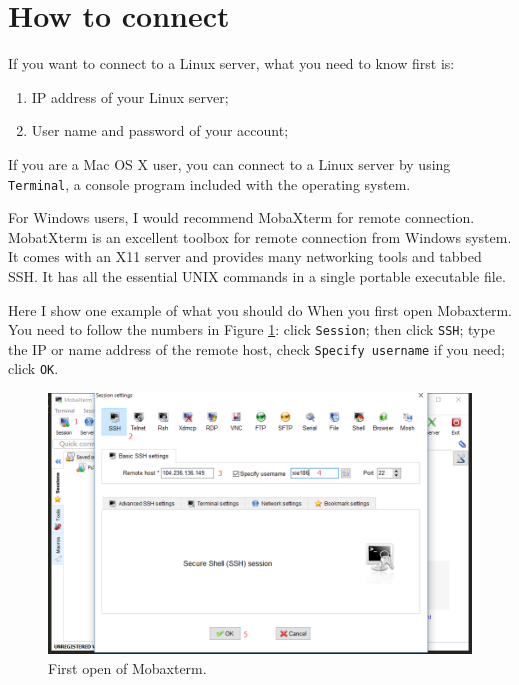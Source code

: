 \documentclass[]{book}
\begin{document}
\hypertarget{how-to-connect}{%
\section{How to connect}\label{how-to-connect}}

If you want to connect to a Linux server, what you need to know first is:

\begin{enumerate}
\def\labelenumi{\arabic{enumi})}
\item
  IP address of your Linux server;
\item
  User name and password of your account;
\end{enumerate}

If you are a Mac OS X user, you can connect to a Linux server by using \texttt{Terminal}, a console program included with the operating system.

For Windows users, I would recommend MobaXterm for remote connection. MobatXterm is an excellent toolbox for remote connection from Windows system. It comes with an X11 server and provides many networking tools and tabbed SSH. It has all the essential UNIX commands in a single portable executable file.

Here I show one example of what you should do When you first open Mobaxterm. You need to follow the numbers in Figure \ref{fig:mobaxtermInit}: click \texttt{Session}; then click \texttt{SSH}; type the IP or name address of the remote host, check \texttt{Specify\ username} if you need; click \texttt{OK}.



\begin{figure}
\centering
\includegraphics{figures/mobaxterm_init.png}
\caption{\label{fig:mobaxtermInit}First open of Mobaxterm.}
\end{figure}
\end{document}
